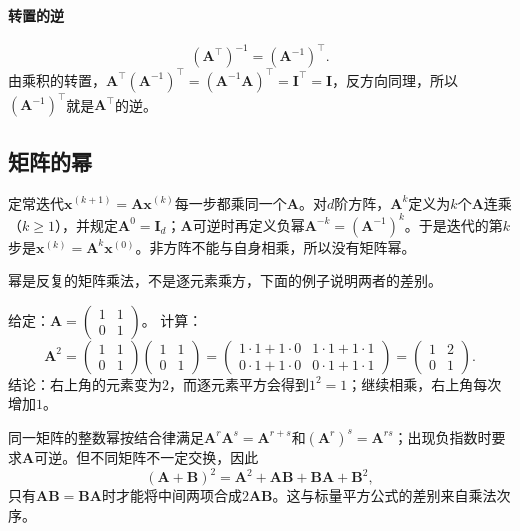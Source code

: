 \paragraph{转置的逆}
\[
 (\bm A^\top)^{-1}=(\bm A^{-1})^\top.
\]
由乘积的转置，$\bm A^\top(\bm A^{-1})^\top=(\bm A^{-1}\bm A)^\top=\bm I^\top=\bm I$，反方向同理，所以$(\bm A^{-1})^\top$就是$\bm A^\top$的逆。

\subsection{矩阵的幂}
\label{sec:ls-matrix-power-rules}

定常迭代$\bm x^{(k+1)}=\bm A\bm x^{(k)}$每一步都乘同一个$\bm A$。对$d$阶方阵，$\bm A^k$定义为$k$个$\bm A$连乘（$k\geq1$），并规定$\bm A^0=\bm I_d$；$\bm A$可逆时再定义负幂$\bm A^{-k}=(\bm A^{-1})^k$。于是迭代的第$k$步是$\bm x^{(k)}=\bm A^k\bm x^{(0)}$。非方阵不能与自身相乘，所以没有矩阵幂。

幂是反复的矩阵乘法，不是逐元素乘方，下面的例子说明两者的差别。
\begin{example}[矩阵的平方不是逐元素平方]
\label{ex:ls-matrix-square-shear}
给定：$\bm A=\left(\begin{smallmatrix}1&1\\0&1\end{smallmatrix}\right)$。
计算：
\[
 \bm A^2=\begin{pmatrix}1&1\\0&1\end{pmatrix}\begin{pmatrix}1&1\\0&1\end{pmatrix}
 =\begin{pmatrix}1\cdot1+1\cdot0&1\cdot1+1\cdot1\\0\cdot1+1\cdot0&0\cdot1+1\cdot1\end{pmatrix}
 =\begin{pmatrix}1&2\\0&1\end{pmatrix}.
\]
结论：右上角的元素变为$2$，而逐元素平方会得到$1^2=1$；继续相乘，右上角每次增加$1$。
\end{example}

同一矩阵的整数幂按结合律满足$\bm A^r\bm A^s=\bm A^{r+s}$和$(\bm A^r)^s=\bm A^{rs}$；出现负指数时要求$\bm A$可逆。但不同矩阵不一定交换，因此
\[
 (\bm A+\bm B)^2=\bm A^2+\bm A\bm B+\bm B\bm A+\bm B^2,
\]
只有$\bm A\bm B=\bm B\bm A$时才能将中间两项合成$2\bm A\bm B$。这与标量平方公式的差别来自乘法次序。

